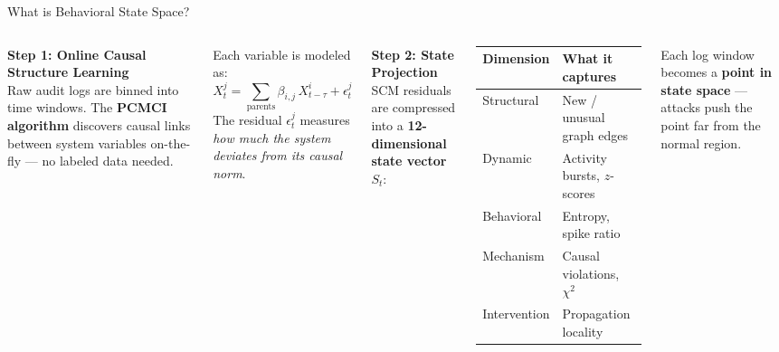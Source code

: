 \documentclass[aspectratio=169]{beamer}
\begin{document}
\begin{frame}{What is Behavioral State Space?}
  \begin{columns}[t]
      \textbf{Step 1: Online Causal Structure Learning}\\[0.3em]
      \small
      Raw audit logs are binned into time windows. The \textbf{PCMCI algorithm} discovers causal links between system variables on-the-fly --- no labeled data needed.

      \vspace{0.4em}
      Each variable is modeled as:
      \[ X^j_t = \sum_{\text{parents}} \beta_{i,j}\, X^i_{t-\tau} + \epsilon^j_t \]
      The residual $\epsilon^j_t$ measures \textit{how much the system deviates from its causal norm}.

      \textbf{Step 2: State Projection}\\[0.3em]
      \small
      SCM residuals are compressed into a \textbf{12-dimensional state vector} $S_t$:

      \vspace{0.3em}
      \centering
      \begin{tabular}{ll}
        \hline
        \textbf{Dimension} & \textbf{What it captures} \\
        \hline
        Structural  & New / unusual graph edges \\
        Dynamic     & Activity bursts, $z$-scores \\
        Behavioral  & Entropy, spike ratio \\
        Mechanism   & Causal violations, $\chi^2$ \\
        Intervention & Propagation locality \\
        \hline
      \end{tabular}

      \vspace{0.4em}
      \raggedright Each log window becomes a \textbf{point in state space} --- attacks push the point far from the normal region.
  \end{columns}
\end{frame}
\end{document}
